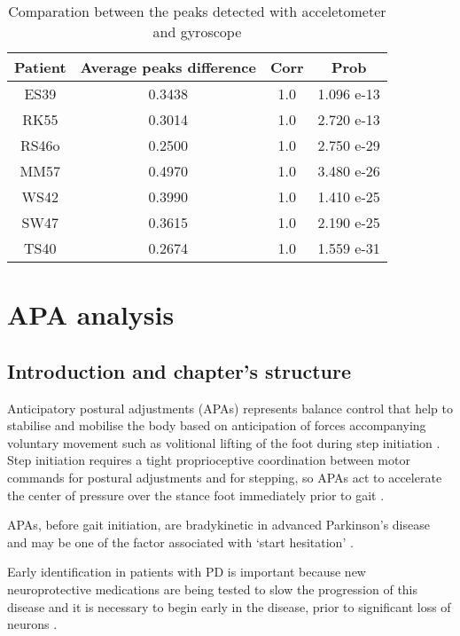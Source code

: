 \begin{table}[h]
	\caption{Comparation between the peaks detected with acceletometer and gyroscope}	
	\centering
	\begin{tabular}{|c|c|c|c|}\hline
		
		Patient 				& Average peaks difference 	& Corr 	& Prob 	\\ \hline
		ES39 & 0.3438			& 1.0									& 1.096 e-13					\\
		RK55	& 0.3014			& 1.0									& 2.720 e-13				\\
		RS46o & 0.2500			& 1.0									& 2.750  e-29					\\
		MM57	& 0.4970			& 1.0									& 3.480 e-26					\\
		WS42  & 0.3990			& 1.0									& 1.410 e-25					\\
		SW47	& 0.3615			& 1.0									& 2.190 e-25					\\
		TS40  & 0.2674			& 1.0									& 1.559 e-31				\\ \hline
	\end{tabular}
	\label{tab:comparationAccGyro}
	
\end{table}



\section{APA analysis}
\subsection{Introduction and chapter's structure}

Anticipatory postural adjustments (APAs)  represents balance control that help to stabilise and mobilise the body based on anticipation of forces accompanying voluntary movement such as volitional lifting of the foot during step initiation \cite{Mancini2010} . Step initiation requires a tight proprioceptive coordination between motor commands for postural adjustments and for stepping, so APAs act to accelerate the center of pressure over the stance foot immediately prior to gait \cite{Mancini2009} .

APAs, before gait initiation, are bradykinetic in advanced Parkinson’s disease and may be one of the factor associated with ‘start hesitation’ \cite{Mancini2009} .

Early identification in patients with PD is important because new neuroprotective medications are being tested to slow the progression of this disease and it is necessary to begin early in the disease, prior to significant loss of neurons \cite{Mancini2012} . 

